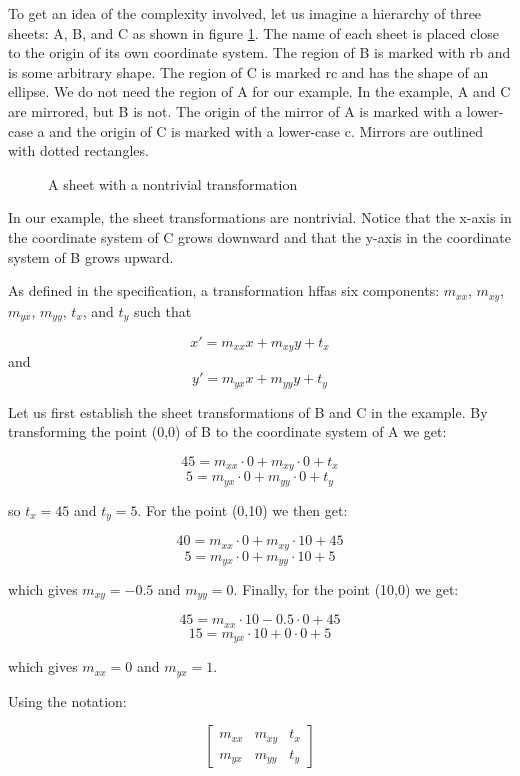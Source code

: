 \documentclass{article}
\def\inputfig#1{}
\begin{document}
To get an idea of the complexity involved, let us imagine a hierarchy
of three sheets: A, B, and C as shown in figure \ref{fignative}.  The
name of each sheet is placed close to the origin of its own coordinate
system.  The region of B is marked with rb and is some arbitrary
shape.  The region of C is marked rc and has the shape of an ellipse.
We do not need the region of A for our example.  In the example, A and
C are mirrored, but B is not.  The origin of the mirror of A is marked
with a lower-case a and the origin of C is marked with a lower-case
c.  Mirrors are outlined with dotted rectangles. 

\begin{figure}
\begin{center}
\inputfig{native.pstex_t}
\end{center}
\caption{\label{fignative} A sheet with a nontrivial transformation}
\end{figure}

In our example, the sheet transformations are nontrivial.  Notice that
the x-axis in the coordinate system of C grows downward and that the
y-axis in the coordinate system of B grows upward.  

As defined in the specification, a transformation hffas six components:
$m_{xx}$, $m_{xy}$, $m_{yx}$, $m_{yy}$, $t_x$, and $t_y$ such that 

$$x' = m_{xx} x + m_{xy} y + t_x$$ and $$y' = m_{yx} x + m_{yy} y + t_y$$

Let us first establish the sheet transformations of B and C in the
example.  By transforming the point (0,0) of B to the coordinate
system of A we get:

$$45 = m_{xx} \cdot 0 + m_{xy} \cdot 0 + t_x$$
$$5 = m_{yx} \cdot 0 + m_{yy} \cdot 0 + t_y$$

so $t_x = 45$ and $t_y = 5$. For the point (0,10) we then get:

$$40 = m_{xx} \cdot 0 + m_{xy} \cdot 10 + 45$$
$$5 = m_{yx} \cdot 0 + m_{yy} \cdot 10 + 5$$

which gives $m_{xy} = -0.5$ and $m_{yy} = 0$.  Finally, for the point
(10,0) we get:

$$45 = m_{xx} \cdot 10 - 0.5  \cdot 0 + 45$$
$$15 = m_{yx} \cdot 10 + 0 \cdot 0 + 5$$

which gives $m_{xx} = 0$ and $m_{yx} = 1$.

Using the notation:

\[ \left[ \begin{array}{ccc}
m_{xx} & m_{xy} & t_x\\
m_{yx} & m_{yy} & t_y 
\end{array} \right] \]
\end{document}
